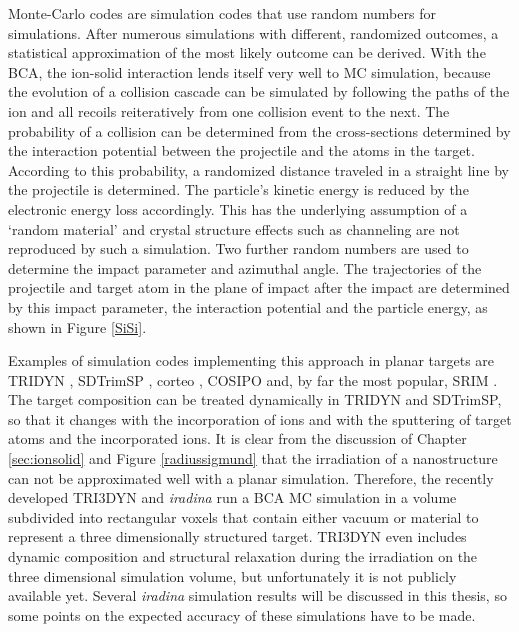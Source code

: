 Monte-Carlo codes are simulation codes that use random numbers for simulations. After numerous simulations with different, randomized outcomes, a statistical approximation of the most likely outcome can be derived. With the BCA, the ion-solid interaction lends itself very well to MC simulation, because the evolution of a collision cascade can be simulated by following the paths of the ion and all recoils reiteratively from one collision event to the next. The probability of a collision can be determined from the cross-sections determined by the interaction potential between the projectile and the atoms in the target. According to this probability, a randomized distance traveled in a straight line by the projectile is determined. The particle's kinetic energy is reduced by the electronic energy loss accordingly. This has the underlying assumption of a `random material' and crystal structure effects such as channeling are not reproduced by such a simulation. Two further random numbers are used to determine the impact parameter and azimuthal angle. The trajectories of the projectile and target atom in the plane of impact after the impact are determined by this impact parameter, the interaction potential and the particle energy, as shown in Figure \ref{SiSi}.

Examples of simulation codes implementing this approach in planar targets are TRIDYN \cite{moller_tridyn_1984}, SDTrimSP \cite{bizyukov_morphology_2008}, corteo \cite{schiettekatte_fast_2008}, COSIPO \cite{hautala_nuclear_1984} and, by far the most popular, SRIM \cite{ziegler_srim_2012}. The target composition can be treated dynamically in TRIDYN and SDTrimSP, so that it changes with the incorporation of ions and with the sputtering of target atoms and the incorporated ions. It is clear from the discussion of Chapter \ref{sec:ionsolid} and Figure \ref{radiussigmund} that the irradiation of a nanostructure can not be approximated well with a planar simulation. Therefore, the recently developed TRI3DYN \cite{moller_tri3dyn_2014} and \emph{iradina} \cite{borschel_ion_2011} run a BCA MC simulation in a volume subdivided into rectangular voxels that contain either vacuum or material to represent a three dimensionally structured target. TRI3DYN even includes dynamic composition and structural relaxation during the irradiation on the three dimensional simulation volume, but unfortunately it is not publicly available yet. Several \emph{iradina} simulation results will be discussed in this thesis, so some points on the expected accuracy of these simulations have to be made. 

